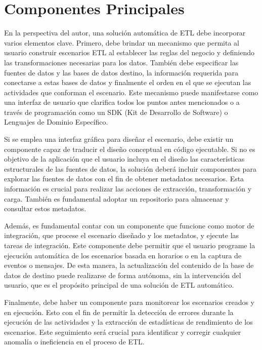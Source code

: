 \section{Componentes Principales} \label{section:PrincipalComp}

En la perspectiva del autor, una solución automática de ETL debe incorporar varios elementos clave. Primero, debe brindar 
un mecanismo que permita al usuario construir escenarios ETL al establecer las reglas del negocio y definiendo las 
transformaciones necesarias para los datos. También debe especificar las fuentes de datos y las bases de datos destino, 
la información requerida para conectarse a estas bases de datos y finalmente el orden en el que se ejecutan las actividades 
que conforman el escenario. Este mecanismo puede manifestarse como una interfaz de usuario que clarifica todos los puntos 
antes mencionados o a través de programación como un SDK (Kit de Desarrollo de Software) o Lenguajes de Dominio Específico.

Si se emplea una interfaz gráfica para diseñar el escenario, debe existir un componente capaz de traducir el diseño 
conceptual en código ejecutable. Si no es objetivo de la aplicación que el usuario incluya en el diseño las características 
estructurales de las fuentes de datos, la solución deberá incluir componentes para explorar 
las fuentes de datos con el fin de obtener metadatos necesarios. Esta información es crucial para realizar las acciones 
de extracción, transformación y carga. También es fundamental adoptar un repositorio para almacenar y consultar estos 
metadatos.

Además, es fundamental contar con un componente que funcione como motor de integración, que procese el escenario diseñado y 
los metadatos, y ejecute las tareas de integración. Este componente debe permitir que el usuario programe la ejecución 
automática de los escenarios basada en horarios o en la captura de eventos o mensajes. De esta manera, la actualización 
del contenido de la base de datos de destino puede realizarse de forma autónoma, sin la intervención del usuario, que es 
el propósito principal de una solución de ETL automático.

Finalmente, debe haber un componente para monitorear los escenarios creados y en ejecución. Esto con el fin de permitir 
la detección de errores durante la ejecución de las actividades y la extracción de estadísticas de rendimiento de los 
escenarios. Este seguimiento será crucial para identificar y corregir cualquier anomalía o ineficiencia en el proceso 
de ETL.  

 